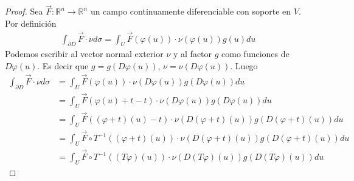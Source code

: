 \documentclass{report}
\newcommand{\realNumbers}{\mathbb{R}}
\theoremstyle{definition}
\theoremstyle{remark}
\begin{document}
\begin{proof}
    Sea \(\vec{F} : \realNumbers^n \rightarrow \realNumbers^n\) un campo continuamente diferenciable con soporte en \(V\).
    Por definición
    \begin{align}
      \int_{\partial D} \vec{F} \cdot \nu d \sigma
      =
      \int_U
        \vec{F}(\varphi(u))
        \cdot
        \nu(\varphi(u))
        g(u)
      du
    \end{align}
    Podemos escribir al vector normal exterior \(\nu\) y al factor \(g\) como funciones de \(D \varphi (u)\).
    Es decir que \(g = g(D \varphi (u))\), \(\nu = \nu(D\varphi(u))\). %
    Luego
    \begin{align}
      \int_{\partial D} \vec{F} \cdot \nu d \sigma
      &=
      \int_U
        \vec{F}(\varphi(u))
        \cdot
        \nu(D \varphi(u))
        g(D \varphi(u))
      du
      \\
      &=
      \int_U
        \vec{F}(\varphi(u) + t - t)
        \cdot
        \nu(D \varphi(u))
        g(D \varphi(u))
      du
      \\
      &=
      \int_U
        \vec{F}((\varphi + t)(u) - t)
        \cdot
        \nu(D (\varphi + t)(u))
        g(D (\varphi + t)(u))
      du
      \\
      &=
      \int_U
        \vec{F} \circ T^{- 1} ((\varphi + t)(u))
        \cdot
        \nu(D (\varphi + t)(u))
        g(D (\varphi + t)(u))
      du
      \\
      &=
      \int_U
        \vec{F} \circ T^{- 1} ((T \varphi)(u))
        \cdot
        \nu(D (T \varphi)(u))
        g(D (T \varphi)(u))
      du
    \end{align}
  \end{proof}
\end{document}
